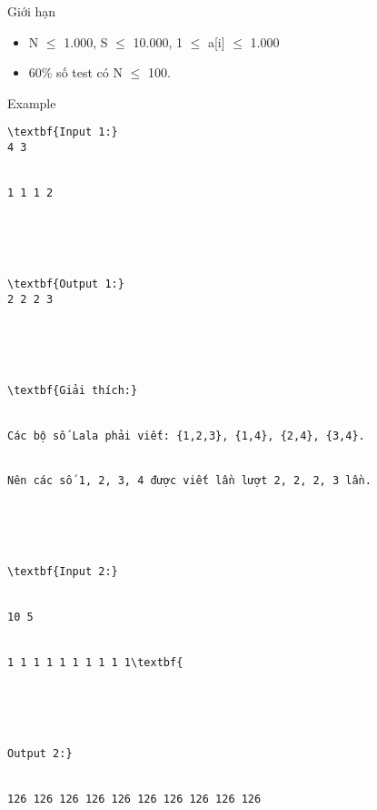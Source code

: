 Giới hạn
\begin{itemize}
	\item     N  $\le$  1.000, S  $\le$  10.000, 1 $\le$  a[i]  $\le$  1.000   
	\item     60\% số test có N  $\le$  100.   
\end{itemize}
Example
\begin{verbatim}
\textbf{Input 1:}
4 3


1 1 1 2





\textbf{Output 1:}
2 2 2 3 





\textbf{Giải thích:}


Các bộ số Lala phải viết: {1,2,3}, {1,4}, {2,4}, {3,4}. 


Nên các số 1, 2, 3, 4 được viết lần lượt 2, 2, 2, 3 lần.





\textbf{Input 2:}


10 5


1 1 1 1 1 1 1 1 1 1\textbf{





Output 2:}


126 126 126 126 126 126 126 126 126 126 \end{verbatim}